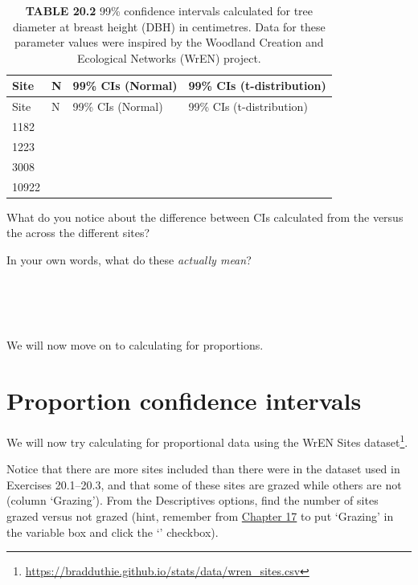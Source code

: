 \documentclass[
  openany]{krantz}
\begin{document}
\begin{longtable}[]{@{}llll@{}}
\caption{\textbf{TABLE 20.2} 99\% confidence intervals calculated for tree diameter at breast height (DBH) in centimetres. Data for these parameter values were inspired by the Woodland Creation and Ecological Networks (WrEN) project.}\tabularnewline
\toprule
Site & N & 99\% CIs (Normal) & 99\% CIs (t-distribution) \\
\midrule
\endfirsthead
\toprule
Site & N & 99\% CIs (Normal) & 99\% CIs (t-distribution) \\
\midrule
\endhead
1182 & & & \\
1223 & & & \\
3008 & & & \\
10922 & & & \\
\bottomrule
\end{longtable}

What do you notice about the difference between CIs calculated from the  versus the  across the different sites?

\newpage

In your own words, what do these  \emph{actually mean}?

\begin{verbatim}




\end{verbatim}

We will now move on to calculating  for proportions.

\hypertarget{proportion-confidence-intervals}{%
\section{Proportion confidence intervals}\label{proportion-confidence-intervals}}

We will now try calculating  for proportional data using the WrEN Sites dataset\footnote{\url{https://bradduthie.github.io/stats/data/wren_sites.csv}}.

Notice that there are more sites included than there were in the dataset used in Exercises 20.1--20.3, and that some of these sites are grazed while others are not (column `Grazing').
From the Descriptives options, find the number of sites grazed versus not grazed (hint, remember from \protect\hyperlink{Chapter_17}{Chapter 17} to put `Grazing' in the variable box and click the `' checkbox).
\end{document}
